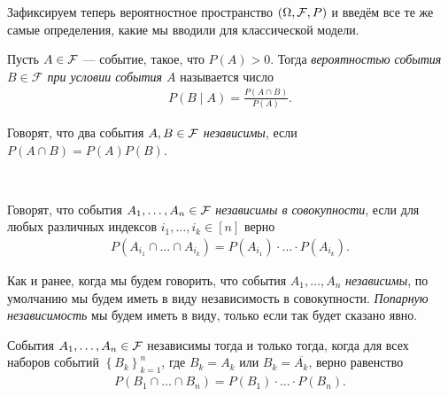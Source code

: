 \documentclass[../main.tex]{subfiles}
\begin{document}
Зафиксируем теперь вероятностное пространство $(\Omega, \mathcal F, P)$ и введём все те же самые определения, какие мы вводили для классической модели. 

\begin{df}
 Пусть $A \in \mathcal F$ --- событие, такое, что $P(A) > 0$. Тогда \textit{вероятностью события $B \in \mathcal F$ при условии события $A$} называется число
 \begin{align*}
  P(B \mid A) = \frac{P(A\cap B)}{P(A)}.
 \end{align*}
\end{df}

\begin{df}
 Говорят, что два события $A, B \in \mathcal F$ \textit{независимы}, если $P(A \cap B) = P(A) P(B)$.
\end{df}
\begin{df}\

 Говорят, что события $A_1, \ldots, A_n \in \mathcal F$ \textit{независимы в совокупности}, если для любых различных индексов $i_1, \ldots, i_k \in [n]$ верно
 \begin{align*}
  P(A_{i_1}\cap \ldots \cap A_{i_k}) = P(A_{i_1}) \cdot \ldots \cdot P(A_{i_k}).
 \end{align*} 
\end{df}
\begin{conventn*}
 Как и ранее, когда мы будем говорить, что события $A_1, \ldots, A_n$ \textit{независимы}, по умолчанию мы будем иметь в виду независимость в совокупности. \textit{Попарную независимость} мы будем иметь в виду, только если так будет сказано явно.
\end{conventn*}
\begin{remrk}
 \label{remark:independed_complement}
 События $A_1, \ldots, A_n \in \mathcal F$ независимы тогда и только тогда, когда для всех наборов событий $\left\{ B_k \right\}_{k=1}^{n}$, где $B_k = A_k$ или $B_k = \overline{A_k}$, верно равенство
 \begin{align}
  \label{equation:remark:independent_complement}
  P(B_1 \cap \ldots \cap B_n) = P(B_1) \cdot\ldots\cdot P(B_n).
 \end{align}
\end{remrk}
\end{document}
